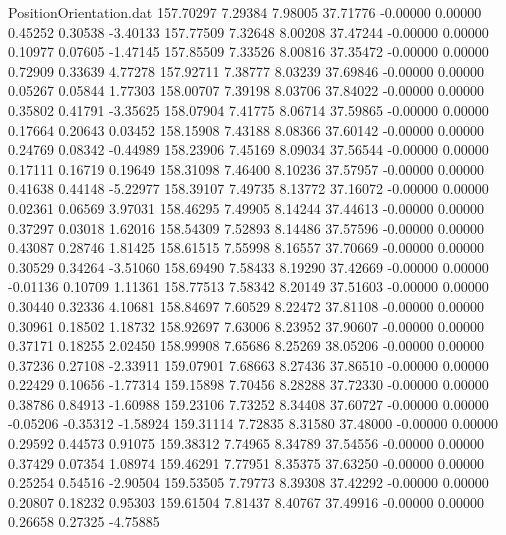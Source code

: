 \begin{filecontents}{PositionOrientation.dat}
 157.70297    7.29384    7.98005    37.71776   -0.00000    0.00000    0.45252    0.30538   -3.40133
 157.77509    7.32648    8.00208    37.47244   -0.00000    0.00000    0.10977    0.07605   -1.47145
 157.85509    7.33526    8.00816    37.35472   -0.00000    0.00000    0.72909    0.33639    4.77278
 157.92711    7.38777    8.03239    37.69846   -0.00000    0.00000    0.05267    0.05844    1.77303
 158.00707    7.39198    8.03706    37.84022   -0.00000    0.00000    0.35802    0.41791   -3.35625
 158.07904    7.41775    8.06714    37.59865   -0.00000    0.00000    0.17664    0.20643    0.03452
 158.15908    7.43188    8.08366    37.60142   -0.00000    0.00000    0.24769    0.08342   -0.44989
 158.23906    7.45169    8.09034    37.56544   -0.00000    0.00000    0.17111    0.16719    0.19649
 158.31098    7.46400    8.10236    37.57957   -0.00000    0.00000    0.41638    0.44148   -5.22977
 158.39107    7.49735    8.13772    37.16072   -0.00000    0.00000    0.02361    0.06569    3.97031
 158.46295    7.49905    8.14244    37.44613   -0.00000    0.00000    0.37297    0.03018    1.62016
 158.54309    7.52893    8.14486    37.57596   -0.00000    0.00000    0.43087    0.28746    1.81425
 158.61515    7.55998    8.16557    37.70669   -0.00000    0.00000    0.30529    0.34264   -3.51060
 158.69490    7.58433    8.19290    37.42669   -0.00000    0.00000   -0.01136    0.10709    1.11361
 158.77513    7.58342    8.20149    37.51603   -0.00000    0.00000    0.30440    0.32336    4.10681
 158.84697    7.60529    8.22472    37.81108   -0.00000    0.00000    0.30961    0.18502    1.18732
 158.92697    7.63006    8.23952    37.90607   -0.00000    0.00000    0.37171    0.18255    2.02450
 158.99908    7.65686    8.25269    38.05206   -0.00000    0.00000    0.37236    0.27108   -2.33911
 159.07901    7.68663    8.27436    37.86510   -0.00000    0.00000    0.22429    0.10656   -1.77314
 159.15898    7.70456    8.28288    37.72330   -0.00000    0.00000    0.38786    0.84913   -1.60988
 159.23106    7.73252    8.34408    37.60727   -0.00000    0.00000   -0.05206   -0.35312   -1.58924
 159.31114    7.72835    8.31580    37.48000   -0.00000    0.00000    0.29592    0.44573    0.91075
 159.38312    7.74965    8.34789    37.54556   -0.00000    0.00000    0.37429    0.07354    1.08974
 159.46291    7.77951    8.35375    37.63250   -0.00000    0.00000    0.25254    0.54516   -2.90504
 159.53505    7.79773    8.39308    37.42292   -0.00000    0.00000    0.20807    0.18232    0.95303
 159.61504    7.81437    8.40767    37.49916   -0.00000    0.00000    0.26658    0.27325   -4.75885

\end{filecontents}
